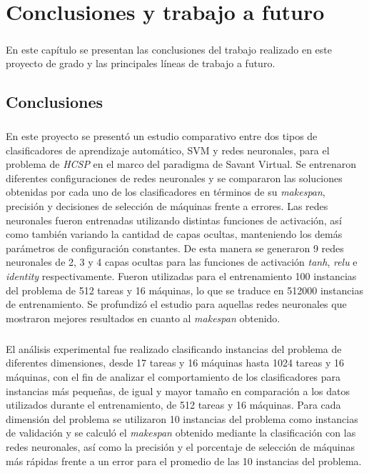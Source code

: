 \chapter{Conclusiones y trabajo a futuro} \label{section-conclusiones}

\paragraph{}En este capítulo se presentan las conclusiones del trabajo realizado en este proyecto de grado y las principales líneas de trabajo a futuro.

\section{Conclusiones}

\paragraph{}En este proyecto se presentó un estudio comparativo entre dos tipos de clasificadores de aprendizaje automático, SVM y redes neuronales, para el problema de \textit{HCSP} en el marco del paradigma de Savant Virtual. Se entrenaron diferentes configuraciones de redes neuronales y se compararon las soluciones obtenidas por cada uno de los clasificadores en términos de su \textit{makespan}, precisión y decisiones de selección de máquinas frente a errores. Las redes neuronales fueron entrenadas utilizando distintas funciones de activación, así como también variando la cantidad de capas ocultas, manteniendo los demás parámetros de configuración constantes. De esta manera se generaron 9 redes neuronales de 2, 3 y 4 capas ocultas para las funciones de activación \textit{tanh}, \textit{relu} e \textit{identity} respectivamente. Fueron utilizadas para el entrenamiento 100 instancias del problema de 512 tareas y 16 máquinas, lo que se traduce en 512000 instancias de entrenamiento. Se profundizó el estudio para aquellas redes neuronales que mostraron mejores resultados en cuanto al \textit{makespan} obtenido.

\paragraph{}El análisis experimental fue realizado clasificando instancias del problema de diferentes dimensiones, desde 17 tareas y 16 máquinas hasta 1024 tareas y 16 máquinas, con el fin de analizar el comportamiento de los clasificadores para instancias más pequeñas, de igual y mayor tamaño en comparación a los datos utilizados durante el entrenamiento, de 512 tareas y 16 máquinas. Para cada dimensión del problema se utilizaron 10 instancias del problema como instancias de validación y se calculó el \textit{makespan} obtenido mediante la clasificación con las redes neuronales, así como la precisión y el porcentaje de selección de máquinas más rápidas frente a un error para el promedio de las 10 instancias del problema.

